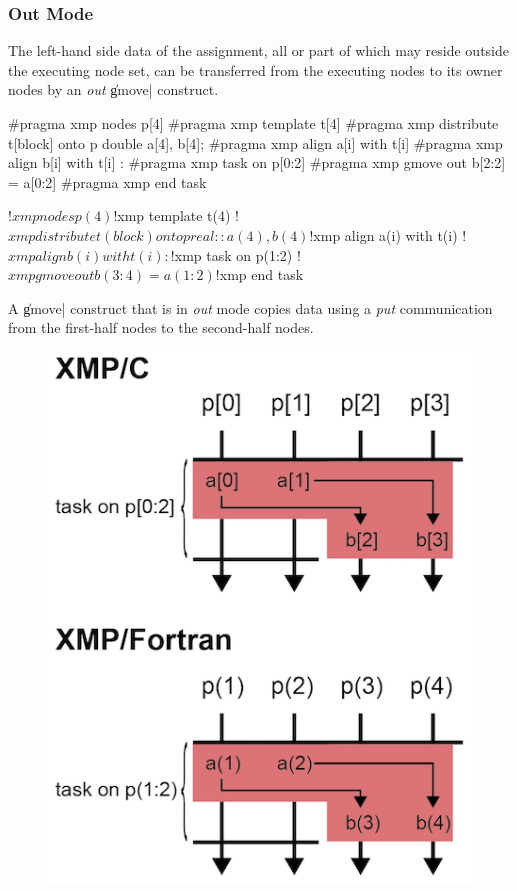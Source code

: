 \subsubsection{Out Mode}

The left-hand side data of the assignment, all or part of which may
reside outside the executing node set, can be transferred from the
executing nodes to its owner nodes by an {\it out} \|gmove| construct.

\begin{XCexample}
#pragma xmp nodes p[4]
#pragma xmp template t[4]
#pragma xmp distribute t[block] onto p
double a[4], b[4];
#pragma xmp align a[i] with t[i]
#pragma xmp align b[i] with t[i]
   :
#pragma xmp task on p[0:2]
#pragma xmp gmove out
  b[2:2] = a[0:2]
#pragma xmp end task
\end{XCexample}

\begin{XFexample}
!$xmp nodes p(4)
!$xmp template t(4)
!$xmp distribute t(block) onto p
real :: a(4), b(4)
!$xmp align a(i) with t(i)
!$xmp align b(i) with t(i)
   :
!$xmp task on p(1:2)
!$xmp gmove out
  b(3:4) = a(1:2)
!$xmp end task
\end{XFexample}

A \|gmove| construct that is in {\it out} mode copies data using a {\it put}
communication from the first-half nodes to the second-half nodes.

\begin{figure}
  \centering
  \includegraphics{figs/gmove_out.png}
\end{figure}


